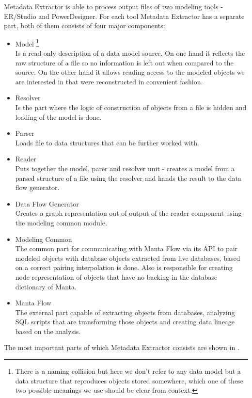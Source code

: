 Metadata Extractor is able to process output files of two modeling tools - ER/Studio and PowerDesigner. For each tool Metadata Extractor has a separate part, both of them consists of four major components:
\begin{itemize}
	\item Model \footnote{There is a naming collision but here we don't refer to any data model but a data structure that reproduces objects stored somewhere, which one of these two possible meanings we use should be clear from context.}\\ 
	Is a read-only description of a data model source. On one hand it reflects the raw structure of a file so no information is left out when compared to the source. 
	On the other hand it allows reading access to the modeled objects we are interested in that were reconstructed in convenient fashion.
	\item Resolver \\ 
	Is the part where the logic of construction of objects from a file is hidden and loading of the model is done. 
	\item Parser \\ 
	Loads file to data structures that can be further worked with.
	\item Reader \\
	Puts together the model, parer and resolver unit - creates a model from a parsed structure of a file using the resolver and hands the result to the data flow generator.
	\item Data Flow Generator \\ 
	Creates a graph representation out of output of the reader component using the modeling common module. 
	\item Modeling Common \\
	The common part for communicating with Manta Flow via its API to pair modeled objects with database objects extracted from live databases, based on a correct pairing interpolation is done. Also is responsible for creating node representation of objects that have no backing in the database dictionary of Manta.
	\item Manta Flow \\
	The external part capable of extracting objects from databases, analyzing SQL scripts that are transforming those objects and creating data lineage based on the analysis.
\end{itemize}

The most important parts of which Metadata Extractor consists are shown in .

